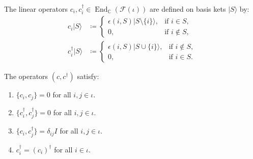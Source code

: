 \begin{definition}
The linear operators $c_i, c_i^\dagger \in \operatorname{End}_{\mathbb{C}}(\mathcal{F}(\iota))$ are defined on basis kets $|S\rangle$ by:
\begin{align}
c_i |S\rangle &\coloneqq \begin{cases} \epsilon(i, S) |S \setminus \{i\}\rangle, & \text{if } i \in S, \\ 0, & \text{if } i \notin S, \end{cases} \\
c_i^\dagger |S\rangle &\coloneqq \begin{cases} \epsilon(i, S) |S \cup \{i\}\rangle, & \text{if } i \notin S, \\ 0, & \text{if } i \in S. \end{cases}
\end{align}
\end{definition}

\begin{theorem}
\label{thm:app_concrete_car}
The operators $(c, c^\dagger)$ satisfy:
\begin{enumerate}
    \item $\{c_i, c_j\} = 0$ for all $i, j \in \iota$.
    \item $\{c_i^\dagger, c_j^\dagger\} = 0$ for all $i, j \in \iota$.
    \item $\{c_i, c_j^\dagger\} = \delta_{ij} I$ for all $i, j \in \iota$.
    \item $c_i^\dagger = (c_i)^\dagger$ for all $i \in \iota$.
\end{enumerate}
\end{theorem}


